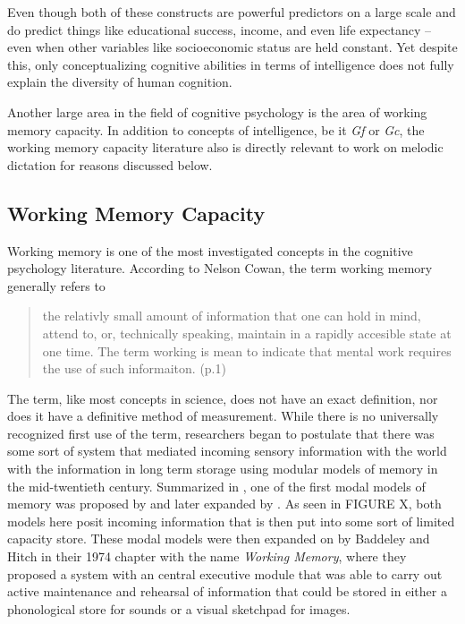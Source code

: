 \documentclass[]{book}
\theoremstyle{definition}
\theoremstyle{definition}
\theoremstyle{definition}
\theoremstyle{remark}
\begin{document}
Even though both of these constructs are powerful predictors on a large
scale and do predict things like educational success, income, and even
life expectancy \citep{ritchieIntelligenceAllThat2015}-- even when other
variables like socioeconomic status are held constant. Yet despite this,
only conceptualizing cognitive abilities in terms of intelligence does
not fully explain the diversity of human cognition.

Another large area in the field of cognitive psychology is the area of
working memory capacity. In addition to concepts of intelligence, be it
\emph{Gf} or \emph{Gc}, the working memory capacity literature also is
directly relevant to work on melodic dictation for reasons discussed
below.

\hypertarget{working-memory-capacity}{%
\subsection{Working Memory Capacity}\label{working-memory-capacity}}

Working memory is one of the most investigated concepts in the cognitive
psychology literature. According to Nelson Cowan, the term working
memory generally refers to

\begin{quote}
the relativly small amount of information that one can hold in mind,
attend to, or, technically speaking, maintain in a rapidly accesible
state at one time. The term working is mean to indicate that mental work
requires the use of such informaiton. (p.1)
\citep{cowanWorkingMemoryCapacity2005}
\end{quote}

The term, like most concepts in science, does not have an exact
definition, nor does it have a definitive method of measurement. While
there is no universally recognized first use of the term, researchers
began to postulate that there was some sort of system that mediated
incoming sensory information with the world with the information in long
term storage using modular models of memory in the mid-twentieth
century. Summarized in \citep{cowanWorkingMemoryCapacity2005}, one of
the first modal models of memory was proposed by
\citep{broadbentPerceptionCommunication1958} and later expanded by
\citep{atkinsonHUMANMEMORYPROPOSED1968}. As seen in FIGURE X, both
models here posit incoming information that is then put into some sort
of limited capacity store. These modal models were then expanded on by
Baddeley and Hitch \citep{baddeleyWorkingMemory1974} in their 1974
chapter with the name \emph{Working Memory}, where they proposed a
system with an central executive module that was able to carry out
active maintenance and rehearsal of information that could be stored in
either a phonological store for sounds or a visual sketchpad for images.
\end{document}
